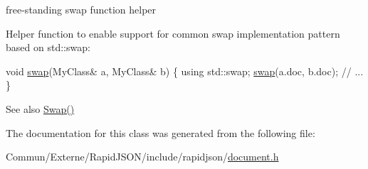 free-\/standing swap function helper 

Helper function to enable support for common swap implementation pattern based on {\ttfamily std\+::swap\+:} 
\begin{DoxyCode}
\textcolor{keywordtype}{void} \hyperlink{class_generic_document_a0d63efcc43758ac3aed77e868233369d}{swap}(MyClass& a, MyClass& b) \{
    \textcolor{keyword}{using} std::swap;
    \hyperlink{class_generic_document_a0d63efcc43758ac3aed77e868233369d}{swap}(a.doc, b.doc);
    \textcolor{comment}{// ...}
\}
\end{DoxyCode}
 \begin{DoxySeeAlso}{See also}
\hyperlink{class_generic_document_a6290e1290fad74177625af5938c0c58f}{Swap()} 
\end{DoxySeeAlso}


The documentation for this class was generated from the following file\+:\begin{DoxyCompactItemize}
\item 
Commun/\+Externe/\+Rapid\+J\+S\+O\+N/include/rapidjson/\hyperlink{document_8h}{document.\+h}\end{DoxyCompactItemize}
